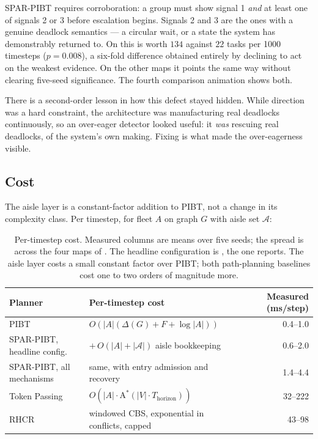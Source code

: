 SPAR-PIBT requires corroboration: a group must show signal 1 \emph{and} at least
one of signals 2 or 3 before escalation begins. Signals 2 and 3 are the ones
with a genuine deadlock semantics --- a circular wait, or a state the system
has demonstrably returned to. On  this is worth
$134$ against $22$ tasks per 1000 timesteps ($p = 0.008$), a six-fold difference
obtained entirely by declining to act on the weakest evidence. On the other
maps it points the same way without clearing five-seed significance. The fourth comparison
animation shows both.

There is a second-order lesson in how this defect stayed hidden. While
direction was a hard constraint, the architecture was manufacturing real
deadlocks continuously, so an over-eager detector looked useful: it \emph{was}
rescuing real deadlocks, of the system's own making. Fixing
 is what made the over-eagerness visible.

\subsection{Cost}
\label{sec:contribution-cost}

The aisle layer is a constant-factor addition to PIBT, not a change in its
complexity class. Per timestep, for fleet $A$ on graph $G$ with aisle set
$\mathcal{A}$:

\begin{table}[H]
\centering
\footnotesize
\begin{tabular}{@{}llr@{}}
\toprule
\textbf{Planner} & \textbf{Per-timestep cost} & \textbf{Measured (ms/step)} \\
\midrule
PIBT \citep{okumura2019pibt}
  & $O(|A|(\Delta(G) + F + \log|A|))$ & 0.4--1.0 \\
SPAR-PIBT, headline config.
  & $+\,O(|A| + |\mathcal{A}|)$ aisle bookkeeping & 0.6--2.0 \\
SPAR-PIBT, all mechanisms
  & same, with entry admission and recovery & 1.4--4.4 \\
Token Passing \citep{ma2017tp}
  & $O(|A| \cdot \mathrm{A}^\ast(|V| \cdot T_{\mathrm{horizon}}))$ & 32--222 \\
RHCR \citep{li2021rhcr}
  & windowed CBS, exponential in conflicts, capped & 43--98 \\
\bottomrule
\end{tabular}
\caption{Per-timestep cost. Measured columns are means over five seeds; the
spread is across the four maps of . The headline
configuration is , the one
 reports. The aisle layer costs a small constant factor over PIBT; both
path-planning baselines cost one to two orders of magnitude more.}
\label{tab:complexity}
\end{table}

